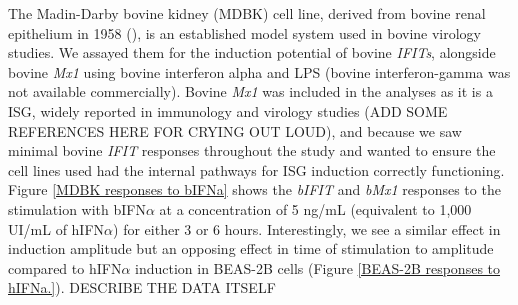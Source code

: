 The Madin-Darby bovine kidney (MDBK) cell line, derived from bovine renal epithelium in 1958 (\cite{Madin1958EstablishedOrigin}), is an established model system used in bovine virology studies. We assayed them for the induction potential of bovine \textit{IFITs}, alongside bovine \textit{Mx1} using bovine interferon alpha and LPS (bovine interferon-gamma was not available commercially). Bovine \textit{Mx1} was included in the analyses as it is a ISG, widely reported in immunology and virology studies (ADD SOME REFERENCES HERE FOR CRYING OUT LOUD), and because we saw minimal bovine \textit{IFIT} responses throughout the study and wanted to ensure the cell lines used had the internal pathways for ISG induction correctly functioning. Figure \ref{MDBK responses to bIFNa} shows the \textit{bIFIT} and \textit{bMx1} responses to the stimulation with bIFN\(\alpha\) at a concentration of 5 ng/mL (equivalent to 1,000 UI/mL of hIFN\(\alpha\)) for either 3 or 6 hours. Interestingly, we see a similar effect in induction amplitude but an opposing effect in time of stimulation to amplitude compared to hIFN\(\alpha\) induction in BEAS-2B cells (Figure \ref{BEAS-2B responses to hIFNa.}). DESCRIBE THE DATA ITSELF

